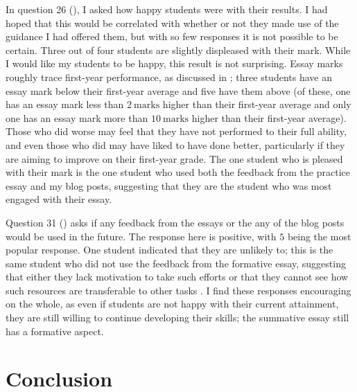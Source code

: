 In question 26 (), I asked how happy students were with their results. I had hoped that this would be correlated with whether or not they made use of the guidance I had offered them, but with so few responses it is not possible to be certain. Three out of four students are slightly displeased with their mark. While I would like my students to be happy, this result is not surprising. Essay marks roughly trace first-year performance, as discussed in ; three students have an essay mark below their first-year average and five have them above (of these, one has an essay mark less than $2~\mathrm{marks}$ higher than their first-year average and only one has an essay mark more than $10~\mathrm{marks}$ higher than their first-year average). Those who did worse may feel that they have not performed to their full ability, and even those who did may have liked to have done better, particularly if they are aiming to improve on their first-year grade. The one student who is pleased with their mark is the one student who used both the feedback from the practice essay and my blog posts, suggesting that they are the student who was most engaged with their essay.

Question 31 () asks if any feedback from the essays or the any of the blog posts would be used in the future. The response here is positive, with $5$ being the most popular response. One student indicated that they are unlikely to; this is the same student who did not use the feedback from the formative essay, suggesting that either they lack motivation to take such efforts or that they cannot see how such resources are transferable to other tasks \citep[cf.][]{Price2010}. I find these responses encouraging on the whole, as even if students are not happy with their current attainment, they are still willing to continue developing their skills; the summative essay still has a formative aspect.

\section{Conclusion}\label{sec:student-conc}

